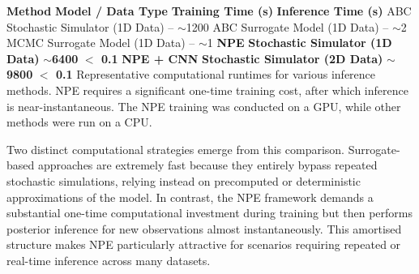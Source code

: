 \documentclass{article}
\providecommand{\DIFdeltex}[1]{{\protect\color{red} \scriptsize #1}} %
\providecommand{\DIFdelbegin}{} %
\providecommand{\DIFdelFL}[1]{\DIFdel{#1}} %
\providecommand{\DIFdel}[1]{\texorpdfstring{\DIFdeltex{#1}}{}} %
\newcommand{\DIFscaledelfig}{0.5}
\newlength{\DIFdelgraphicswidth} %
\newlength{\DIFdelgraphicsheight} %
\newcommand{\DIFdelincludegraphics}[2][]{%
\sbox{\DIFdelgraphicsbox}{\DIFOincludegraphics[#1]{#2}}%
\settoboxwidth{\DIFdelgraphicswidth}{\DIFdelgraphicsbox} %
\settoboxtotalheight{\DIFdelgraphicsheight}{\DIFdelgraphicsbox} %
\scalebox{\DIFscaledelfig}{%
\parbox[b]{\DIFdelgraphicswidth}{\usebox{\DIFdelgraphicsbox}\\[-\baselineskip] \rule{\DIFdelgraphicswidth}{0em}}\llap{\resizebox{\DIFdelgraphicswidth}{\DIFdelgraphicsheight}{%
\setlength{\unitlength}{\DIFdelgraphicswidth}%
\begin{picture}(1,1)%
\thicklines\linethickness{2pt} %
{\color[rgb]{1,0,0}\put(0,0){\framebox(1,1){}}}%
{\color[rgb]{1,0,0}\put(0,0){\line( 1,1){1}}}%
{\color[rgb]{1,0,0}\put(0,1){\line(1,-1){1}}}%
\end{picture}%
}\hspace*{3pt}}} %
} %
\DeclareRobustCommand{\DIFdelbegin}{\DIFOdelbegin \let\includegraphics\DIFdelincludegraphics} %
\begin{document}
\DIFdelbegin %
\DIFdelFL{\textbf{Method} }%
\DIFdelFL{\textbf{Model / Data Type} }%
\DIFdelFL{\textbf{Training Time (s)} }%
\DIFdelFL{\textbf{Inference Time (s)} }%
\DIFdelFL{ABC }%
\DIFdelFL{Stochastic Simulator (1D Data) }%
\DIFdelFL{-- }%
\DIFdelFL{$\sim$1200 }%
\DIFdelFL{ABC }%
\DIFdelFL{Surrogate Model (1D Data) }%
\DIFdelFL{-- }%
\DIFdelFL{$\sim$2 }%
\DIFdelFL{MCMC }%
\DIFdelFL{Surrogate Model (1D Data) }%
\DIFdelFL{-- }%
\DIFdelFL{$\sim$1 }%
\DIFdelFL{\textbf{NPE} }%
\DIFdelFL{\textbf{Stochastic Simulator (1D Data)} }%
\DIFdelFL{\textbf{$\sim$6400} }%
\DIFdelFL{\textbf{$<$ 0.1} }%
\DIFdelFL{\textbf{NPE + CNN} }%
\DIFdelFL{\textbf{Stochastic Simulator (2D Data)} }%
\DIFdelFL{\textbf{$\sim$9800} }%
\DIFdelFL{\textbf{$<$ 0.1} }%
{%
\DIFdelFL{Representative computational runtimes for various inference methods. NPE requires a significant one-time training cost, after which inference is near-instantaneous. The NPE training was conducted on a GPU, while other methods were run on a CPU.}}	%

\DIFdel{Two distinct computational strategies emerge from this comparison. Surrogate-based approaches are extremely fast because they entirely bypass repeated stochastic simulations, relying instead on precomputed or deterministic approximations of the model. In contrast, the NPE framework demands a substantial one-time computational investment during training but then performs posterior inference for new observations almost instantaneously. This amortised structure makes NPE particularly attractive for scenarios requiring repeated or real-time inference across many datasets. 
}%
\end{document}
